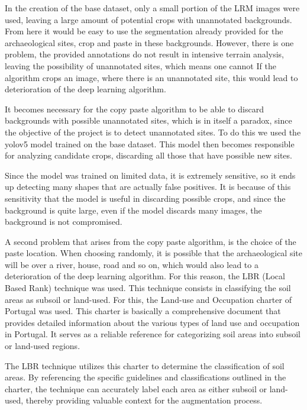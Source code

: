 In the creation of the base dataset, only a small portion of the LRM images were used, leaving a large amount of potential crops with unannotated backgrounds. From here it would be easy to use the segmentation already provided for the archaeological sites, crop and paste in these backgrounds. However, there is one problem, the provided annotations do not result in intensive terrain analysis, leaving the possibility of unannotated sites, which means one cannot If the algorithm crops an image, where there is an unannotated site, this would lead to deterioration of the deep learning algorithm.

It becomes necessary for the copy paste algorithm to be able to discard backgrounds with possible unannotated sites, which is in itself a paradox, since the objective of the project is to detect unannotated sites. To do this we used the yolov5 model trained on the base dataset. This model then becomes responsible for analyzing candidate crops, discarding all those that have possible new sites. 

Since the model was trained on limited data, it is extremely sensitive, so it ends up detecting many shapes that are actually false positives. It is because of this sensitivity that the model is useful in discarding possible crops, and since the background is quite large, even if the model discards many images, the background is not compromised.

A second problem that arises from the copy paste algorithm, is the choice of the paste location. When choosing randomly, it is possible that the archaeological site will be over a river, house, road and so on, which would also lead to a deterioration of the deep learning algorithm. For this reason, the LBR (Local Based Rank) technique was used. This technique consists in classifying the soil areas as subsoil or land-used. For this, the Land-use and Occupation charter of Portugal\cite{charterPortugal} was used. This charter is basically a comprehensive document that provides detailed information about the various types of land use and occupation in Portugal. It serves as a reliable reference for categorizing soil areas into subsoil or land-used regions.

The LBR technique utilizes this charter to determine the classification of soil areas. By referencing the specific guidelines and classifications outlined in the charter, the technique can accurately label each area as either subsoil or land-used, thereby providing valuable context for the augmentation process.

